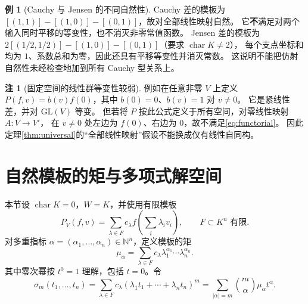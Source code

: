 \documentclass[UTF8,11pt,a4paper]{ctexart}
\theoremstyle{definition}
\newtheorem{example}[theorem]{例}
\newtheorem{remark}[theorem]{注}
\newcommand{\N}{\mathbb N}
\begin{document}
\begin{example}[Cauchy 与 Jensen 的不同自然性]
Cauchy 差的模板为
$[(1,1)]-[(1,0)]-[(0,1)]$，故对全部线性映射自然。
它\textbf{不}满足对两个输入同时平移的等变性，也不消灭非零常值函数。
Jensen 差的模板为
$2[(1/2,1/2)]-[(1,0)]-[(0,1)]$（要求 $\operatorname{char}K\ne2$），
每个支点坐标和均为 $1$、系数总和为零，因此还具有平移等变性并消灭常数。
这说明不能把仿射自然性未经检查地加到所有 Cauchy 型关系上。
\end{example}

\begin{remark}[固定空间的线性群等变性较弱]
例如在任意非零 $V$ 上定义
$P(f,v)=b(v)f(0)$，其中 $b(0)=0$、$b(v)=1$ 对 $v\ne0$。
它是紧线性差，并对 $\mathrm{GL}(V)$ 等变。
但若将 $P$ 按此公式定义于所有空间，对零线性映射 $A:V\to V'$，
在 $v\ne0$ 处左边为 $f(0)$、右边为 $0$，故不满足\eqref{eq:functorial}。
因此定理\ref{thm:universal}的“全部线性映射”假设不能换成仅有线性自同构。
\end{remark}

\section{自然模板的矩与多项式解空间}\label{sec:moments}
本节设 $\operatorname{char}K=0$，$W=K$，并使用有限模板
\[
 P_V(f,v)=\sum_{\lambda\in F}c_\lambda f\left(\sum_i\lambda_iv_i\right),
 \qquad F\subset K^n\text{ 有限}.
\]
对多重指标 $\alpha=(\alpha_1,\ldots,\alpha_n)\in\N^n$，定义模板的矩
\[
 \mu_\alpha=\sum_{\lambda\in F}c_\lambda\lambda_1^{\alpha_1}\cdots\lambda_n^{\alpha_n}.
\]
其中零次幂按 $t^0=1$ 理解，包括 $t=0$。令
\begin{equation}\label{eq:symbol}
 \sigma_m(t_1,\ldots,t_n)=\sum_{\lambda\in F}c_\lambda
 (\lambda_1t_1+\cdots+\lambda_nt_n)^m
 =\sum_{|\alpha|=m}\binom m\alpha\mu_\alpha t^\alpha.
\end{equation}
\end{document}
